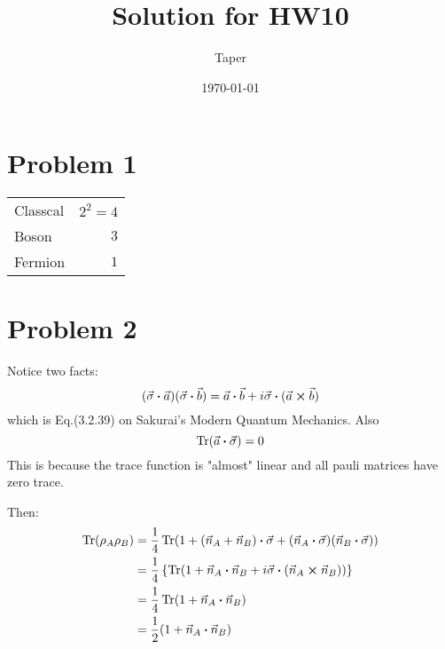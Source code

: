 \documentclass{article}
\title{Solution for HW10}
\date{\today}
\author{Taper}
\begin{document}
\maketitle
{}
\section*{Problem 1}
\begin{tabular}{l|r}
    Classcal & $2^2=4$ \\
    Boson    & $3$ \\
    Fermion & $1$
\end{tabular}

\section*{Problem 2}
Notice two facts:
\begin{equation}
    (\vec{\sigma}\vdot\vec{a})(\vec{\sigma}\vdot\vec{b})
    = \vec{a}\vdot\vec{b}+i\vec{\sigma}\vdot(\vec{a}\cross\vec{b})
\end{equation}
which is Eq.(3.2.39) on Sakurai's Modern Quantum Mechanics. Also
\begin{equation}
    \Tr(\vec{a}\vdot\vec{\sigma})=0
\end{equation}
This is because the trace function is "almost" linear and all pauli
matrices have zero trace.

Then:
\begin{align*}
    \Tr(\rho_A\rho_B)
    &=
    \frac{1}{4}\Tr(
        1+(\vec{n}_A+\vec{n}_B)\vdot\vec{\sigma}
        + (\vec{n}_A\vdot\vec{\sigma})(\vec{n}_B\vdot\vec{\sigma})
    )\\
    &=
    \frac{1}{4}\left\{
        \Tr(1+
            \vec{n}_A\vdot\vec{n}_B +
            i\vec{\sigma}\vdot(\vec{n}_A\cross\vec{n}_B)
    )\right\}\\
    &=\frac{1}{4}\Tr(1+\vec{n}_A\vdot\vec{n}_B)
    \\
    &=\frac{1}{2}(1+\vec{n}_A\vdot\vec{n}_B)
\end{align*}
\end{document}
